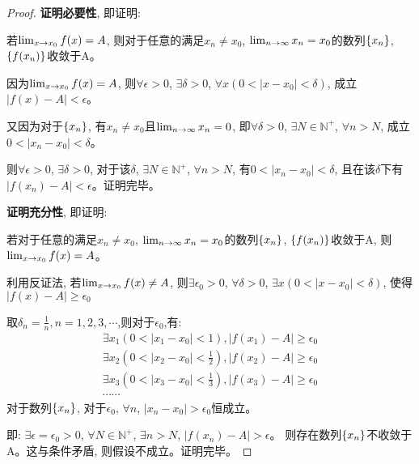 \begin{proof}
    {\bf 证明必要性}, 即证明: 
    
    若$\lim_{x \to x_0 } f(x) = A$, 则对于任意的满足$x_n \neq x_0$, $\lim_{n \to \infty } x_n = x_0$的数列$\left\{ x_n\right\}$, $\left\{ f(x_n)\right\}$收敛于A。

    因为$\lim_{x \to x_0 } f(x) = A$, 则$\forall \epsilon > 0$, $\exists \delta > 0$, $\forall x ( 0 < \left| x - x_0 \right| < \delta)$, 成立$\left| f(x) - A \right| < \epsilon$。

    又因为对于$\left\{ x_n\right\}$, 有$x_n \neq x_0$且$\lim_{n \to \infty } x_n = 0$, 即$\forall \delta > 0$, $\exists N \in \mathbb{N}^+$, $\forall n > N$, 成立$0 < \left| x_n - x_0 \right| < \delta$。

    则$\forall \epsilon > 0$, $\exists \delta > 0$, 对于该$\delta$, $\exists N \in \mathbb{N}^+$, $\forall n > N$, 有$0 < \left| x_n - x_0 \right| < \delta$, 且在该$\delta$下有$\left| f(x_n) - A \right| < \epsilon$。证明完毕。

    {\bf 证明充分性}, 即证明:
    
    若对于任意的满足$x_n \neq x_0$, $\lim_{n \to \infty } x_n = x_0$的数列$\left\{ x_n\right\}$, $\left\{ f(x_n)\right\}$收敛于A, 则$\lim_{x \to x_0 } f(x) = A$。

    利用反证法, 若$\lim_{x \to x_0 } f(x) \neq A$, 则$\exists \epsilon_0 > 0$, $\forall \delta > 0$, $\exists x ( 0 < \left| x - x_0 \right| < \delta)$, 使得$\left| f(x) - A \right| \ge \epsilon_0$

    取$\delta_n = \frac{1}{n}, n = 1, 2, 3, \cdots$,则对于$\epsilon_0$,有:
    \begin{gather*}
        \exists x_1(0 < \left| x_1 -x_0 \right| < 1), \left| f(x_1) - A \right| \ge \epsilon_0 \\
        \exists x_2(0 < \left| x_2 -x_0 \right| < \frac{1}{2}), \left| f(x_2) - A \right| \ge \epsilon_0 \\
        \exists x_3(0 < \left| x_3 -x_0 \right| < \frac{1}{3}), \left| f(x_3) - A \right| \ge \epsilon_0 \\
        \cdots \cdots
    \end{gather*}
    对于数列$\left\{ x_n\right\}$, 对于$\epsilon_0$, $\forall n$, $\left| x_n - x_0\right| > \epsilon_0$恒成立。

    即: $\exists \epsilon = \epsilon_0 > 0$, $\forall N \in \mathbb{N}^+$, $\exists n > N$, $\left| f(x_n) - A\right| > \epsilon$。
    则存在数列$\left\{ x_n\right\}$不收敛于A。这与条件矛盾, 则假设不成立。证明完毕。

\end{proof}

